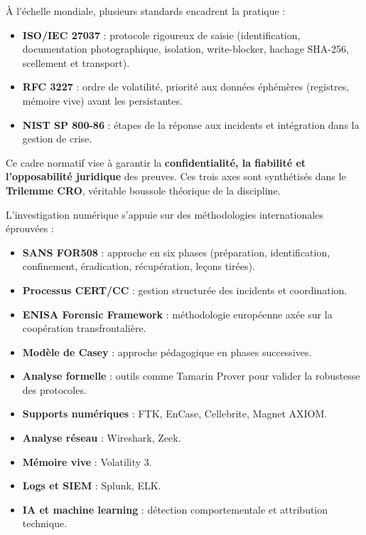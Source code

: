 \documentclass[12pt,a4paper]{report}
\begin{document}
{À l’échelle mondiale, plusieurs standards encadrent la pratique :  

\begin{itemize}
    \item \textbf{ISO/IEC 27037} : protocole rigoureux de saisie (identification, documentation photographique, isolation, write-blocker, hachage SHA-256, scellement et transport).  

    \item \textbf{RFC 3227} : ordre de volatilité, priorité aux données éphémères (registres, mémoire vive) avant les persistantes.  

    \item \textbf{NIST SP 800-86} : étapes de la réponse aux incidents et intégration dans la gestion de crise.  
\end{itemize}

\noindent
Ce cadre normatif vise à garantir la \textbf{confidentialité, la fiabilité et l’opposabilité juridique} des preuves.  
Ces trois axes sont synthétisés dans le \textbf{Trilemme CRO}, véritable boussole théorique de la discipline.

L’investigation numérique s’appuie sur des méthodologies internationales éprouvées :  

\begin{itemize}
    \item \textbf{SANS FOR508} : approche en six phases (préparation, identification, confinement, éradication, récupération, leçons tirées).  
    \item \textbf{Processus CERT/CC} : gestion structurée des incidents et coordination.  
    \item \textbf{ENISA Forensic Framework} : méthodologie européenne axée sur la coopération transfrontalière.  
    \item \textbf{Modèle de Casey} : approche pédagogique en phases successives.  
    \item \textbf{Analyse formelle} : outils comme Tamarin Prover pour valider la robustesse des protocoles.  
\end{itemize}

\begin{itemize}
    \item \textbf{Supports numériques} : FTK, EnCase, Cellebrite, Magnet AXIOM.  
    \item \textbf{Analyse réseau} : Wireshark, Zeek.  
    \item \textbf{Mémoire vive} : Volatility 3.  
    \item \textbf{Logs et SIEM} : Splunk, ELK.  
    \item \textbf{IA et machine learning} : détection comportementale et attribution technique.  
\end{itemize}

}
\end{document}
